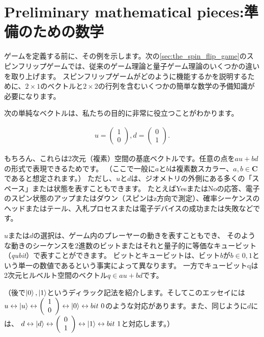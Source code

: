 \section{Preliminary mathematical pieces:準備のための数学}

ゲームを定義する前に、その例を示します。次の\autoref{sec:the_spin_flip_game}のスピンフリップゲームでは、従来のゲーム理論と量子ゲーム理論のいくつかの違いを取り上げます。
スピンフリップゲームがどのように機能するかを説明するために、$2 \times 1$のベクトルと$2 \times 2$の行列を含むいくつかの簡単な数学の予備知識が必要になります。

次の単純なベクトルは、私たちの目的に非常に役立つことがわかります。

\begin{align}
u = \left(  
\begin{array}{ccc}
 1 \\
 0 
\end{array}
\right) 
,
d = \left(  
\begin{array}{ccc}
 0 \\
 1 
\end{array}
\right).
\end{align}

もちろん、これらは2次元（複素）空間の基底ベクトルです。任意の点を$au + bd$の形式で表現できるためです。
（ここで一般に$a$と$b$は複素数スカラー、$a,b \in \mathbf{C}$であると想定されます。）
ただし、$u$と$d$は、ジオメトリの外側にある多くの「スペース」または状態を表すこともできます。
たとえばYesまたはNoの応答、電子のスピン状態のアップまたはダウン（スピンはz方向で測定）、確率シーケンスのヘッドまたはテール、入札プロセスまたは電子デバイスの成功または失敗などです。

$u$または$d$の選択は、ゲーム内のプレーヤーの動きを表すこともでき、
そのような動きのシーケンスを2進数のビットまたはそれと量子的に等価なキュービット（\textit{qubit}）で表すことができます。
ビットとキュービットは、ビット$b$が$b \in {0,1}$という単一の数値であるという事実によって異なります。
一方でキュービットqは2次元ヒルベルト空間のベクトル$q \in {au + bd}$です。

（後で$\ket{0},\ket{1}$というディラック記法を紹介します。そしてこのエッセイには $u \leftrightarrow \ket{u} \leftrightarrow \left(  
\begin{array}{ccc}
 1 \\
 0 
\end{array}
\right) \leftrightarrow \ket{0} \leftrightarrow bit \ 0$のような対応があります。また、同じように$d$には、
$ d \leftrightarrow \ket{d} \leftrightarrow \left(  
\begin{array}{ccc}
 0 \\
 1 
\end{array}
\right) \leftrightarrow \ket{1} \leftrightarrow bit \ 1 $と対応します。）

